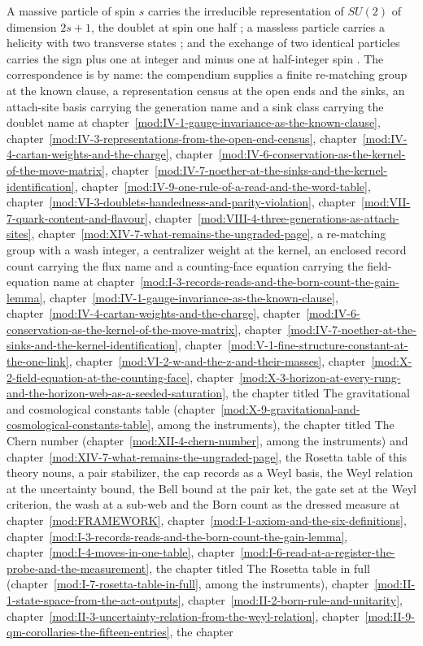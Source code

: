 \begin{chbridge}
A massive particle of spin $s$ carries the irreducible representation of $SU(2)$ of dimension $2s + 1$, the doublet at spin one half \cite{Wigner1959}; a massless particle carries a helicity with two transverse states \cite{Wigner1939}; and the exchange of two identical particles carries the sign plus one at integer and minus one at half-integer spin \cite{Pauli1940}. The correspondence is by name: the compendium supplies a finite re-matching group at the known clause, a representation census at the open ends and the sinks, an attach-site basis carrying the generation name and a sink class carrying the doublet name at chapter~\ref{mod:IV-1-gauge-invariance-as-the-known-clause}, chapter~\ref{mod:IV-3-representations-from-the-open-end-census}, chapter~\ref{mod:IV-4-cartan-weights-and-the-charge}, chapter~\ref{mod:IV-6-conservation-as-the-kernel-of-the-move-matrix}, chapter~\ref{mod:IV-7-noether-at-the-sinks-and-the-kernel-identification}, chapter~\ref{mod:IV-9-one-rule-of-a-read-and-the-word-table}, chapter~\ref{mod:VI-3-doublets-handedness-and-parity-violation}, chapter~\ref{mod:VII-7-quark-content-and-flavour}, chapter~\ref{mod:VIII-4-three-generations-as-attach-sites}, chapter~\ref{mod:XIV-7-what-remains-the-ungraded-page}, a re-matching group with a wash integer, a centralizer weight at the kernel, an enclosed record count carrying the flux name and a counting-face equation carrying the field-equation name at chapter~\ref{mod:I-3-records-reads-and-the-born-count-the-gain-lemma}, chapter~\ref{mod:IV-1-gauge-invariance-as-the-known-clause}, chapter~\ref{mod:IV-4-cartan-weights-and-the-charge}, chapter~\ref{mod:IV-6-conservation-as-the-kernel-of-the-move-matrix}, chapter~\ref{mod:IV-7-noether-at-the-sinks-and-the-kernel-identification}, chapter~\ref{mod:V-1-fine-structure-constant-at-the-one-link}, chapter~\ref{mod:VI-2-w-and-the-z-and-their-masses}, chapter~\ref{mod:X-2-field-equation-at-the-counting-face}, chapter~\ref{mod:X-3-horizon-at-every-rung-and-the-horizon-web-as-a-seeded-saturation}, the chapter titled The gravitational and cosmological constants table (chapter~\ref{mod:X-9-gravitational-and-cosmological-constants-table}, among the instruments), the chapter titled The Chern number (chapter~\ref{mod:XII-4-chern-number}, among the instruments) and chapter~\ref{mod:XIV-7-what-remains-the-ungraded-page}, the Rosetta table of this theory nouns, a pair stabilizer, the cap records as a Weyl basis, the Weyl relation at the uncertainty bound, the Bell bound at the pair ket, the gate set at the Weyl criterion, the wash at a sub-web and the Born count as the dressed measure at chapter~\ref{mod:FRAMEWORK}, chapter~\ref{mod:I-1-axiom-and-the-six-definitions}, chapter~\ref{mod:I-3-records-reads-and-the-born-count-the-gain-lemma}, chapter~\ref{mod:I-4-moves-in-one-table}, chapter~\ref{mod:I-6-read-at-a-register-the-probe-and-the-measurement}, the chapter titled The Rosetta table in full (chapter~\ref{mod:I-7-rosetta-table-in-full}, among the instruments), chapter~\ref{mod:II-1-state-space-from-the-act-outputs}, chapter~\ref{mod:II-2-born-rule-and-unitarity}, chapter~\ref{mod:II-3-uncertainty-relation-from-the-weyl-relation}, chapter~\ref{mod:II-9-qm-corollaries-the-fifteen-entries}, the chapter 
\end{chbridge}
